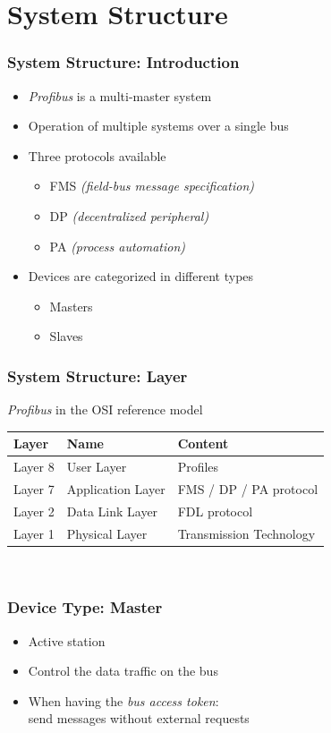 \documentclass{beamer}
\begin{document}
\section{System Structure}
\begin{frame}
  \frametitle{System Structure: Introduction}
  \begin{itemize}
    \item \textit{Profibus} is a multi-master system
    \item Operation of multiple systems over a single bus
    \item Three protocols available
      \begin{itemize}
        \item FMS \textit{(field-bus message specification)}
        \item DP \textit{(decentralized peripheral)}
        \item PA \textit{(process automation)}
      \end{itemize}
    \item Devices are categorized in different types
      \begin{itemize}
        \item Masters
        \item Slaves
      \end{itemize}
  \end{itemize}
\end{frame}

\begin{frame}
  \frametitle{System Structure: Layer}
  \textit{Profibus} in the OSI reference model~\cite{profibusmanual}
  \center
  \footnotesize
  \begin{tabular}[h]{l|l|l}
    \textbf{Layer}  & \textbf{Name}     & \textbf{Content} \\
    \hline
    Layer 8         & User Layer        & Profiles \\
    Layer 7         & Application Layer & FMS / DP / PA protocol \\
    Layer 2         & Data Link Layer   & FDL protocol \\
    Layer 1         & Physical Layer    & Transmission Technology
  \end{tabular} \\
\end{frame}


\begin{frame}
  \frametitle{Device Type: Master}
  \begin{itemize}
    \item Active station
    \item Control the data traffic on the bus
    \item When having the \textit{bus access token}: \\
      send messages without external requests
  \end{itemize}
\end{frame}
\end{document}
